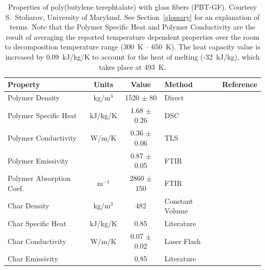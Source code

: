 \begin{table}[h!]
\caption[Properties of poly(butylene terephtalate) with glass fibers (PBT-GF).]{Properties of poly(butylene terephtalate) with glass fibers (PBT-GF).
Courtesy S.~Stoliarov, University of Maryland. See Section~\ref{glossary} for an explanation of terms. Note that the Polymer Specific Heat and Polymer Conductivity
are the result of averaging the reported temperature dependent properties over the room to decomposition temperature range (300~K -- 650~K).
The heat capacity value is increased by 0.09~kJ/kg/K to account for the heat of melting (-32~kJ/kg), which takes place at 493~K.}
\begin{center}
\begin{tabular}{|l|c|c|l|l|}
\hline
Property                &      Units    &      Value                        & Method                                    & Reference                     \\ \hline \hline
Polymer Density         &     kg/m$^3$  & 1520 $\pm$ 80                     & Direct                                    & \cite{Kempel:1}               \\ \hline
Polymer Specific Heat   &    kJ/kg/K    & 1.68 $\pm$ 0.26                   & DSC                                       & \cite{Kempel:1}               \\ \hline
Polymer Conductivity    &      W/m/K    & 0.36 $\pm$ 0.06                   & TLS                                       & \cite{Kempel:1}               \\ \hline
Polymer Emissivity      &               & 0.87 $\pm$ 0.05                   & FTIR                                      & \cite{Linteris:2}             \\ \hline
Polymer Absorption Coef.&  m$^{-1}$     & 2860 $\pm$ 150                    & FTIR                                      & \cite{Linteris:2}             \\ \hline
Char Density            &     kg/m$^3$  &        482                        & Constant Volume                           & \cite{Kempel:1}               \\ \hline
Char Specific Heat      &    kJ/kg/K    &        0.85                       & Literature                                & \cite{SCHOTT}                 \\ \hline
Char Conductivity       &      W/m/K    & 0.07 $\pm$ 0.02                   & Laser Flash                               & \cite{Kempel:1}               \\ \hline
Char Emissivity         &               &       0.85                        & Literature                                & \cite{Braeuer:1}              \\ \hline

\end{tabular}
\end{center}
\end{table}
